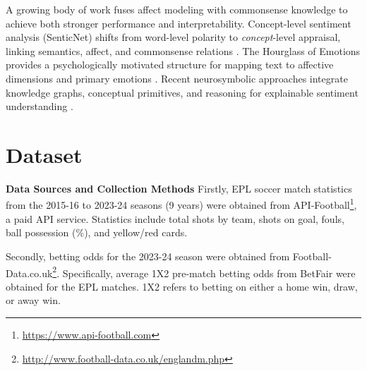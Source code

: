 \documentclass[conference]{IEEEtran}
\begin{document}

A growing body of work fuses affect modeling with commonsense knowledge to achieve
both stronger performance and interpretability. Concept-level sentiment analysis
(SenticNet) shifts from word-level polarity to \emph{concept}-level appraisal, linking
semantics, affect, and commonsense relations \cite{cambria2013statistical,cambria2023seven}.
The Hourglass of Emotions provides a psychologically motivated structure for mapping
text to affective dimensions and primary emotions \cite{susanto2020hourglass}. Recent
neurosymbolic approaches integrate knowledge graphs, conceptual primitives, and
reasoning for explainable sentiment understanding \cite{li2024primenet,cambria2024understanding}.

\section{Dataset}
\noindent\textbf{Data Sources and Collection Methods}
Firstly, EPL soccer match statistics from the 2015-16 to 2023-24 seasons (9 years) were obtained from 
API-Football\footnote{\url{https://www.api-football.com}}, a paid API 
service. Statistics include total shots by team, shots on 
goal, fouls, ball possession (\%), and yellow/red cards.

Secondly, betting odds for the 2023-24 season 
were obtained from Football-Data.co.uk\footnote{\url{http://www.football-data.co.uk/englandm.php}}. Specifically, average 1X2 pre-match betting odds from BetFair were 
obtained for the EPL matches. 1X2 refers to betting 
on either a home win, draw, or away win.
\end{document}

